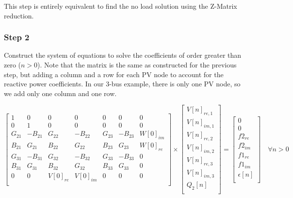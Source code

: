 \documentclass[11pt,fleqn]{book} %
\begin{document}
This step is entirely equivalent to find the no load solution using the Z-Matrix reduction.

\subsubsection{Step 2}

Construct the system of equations to solve the coefficients of order greater than zero ($n>0$). Note that the matrix is the same as constructed for the previous step, but adding a column and a row for each PV node to account for the reactive power coefficients. In our 3-bus example, there is only one PV node, so we add only one column and one row.

\begin{equation}
\begin{bmatrix}
1 & 0 & 0 & 0 & 0 & 0 & 0\\
0 & 1 & 0 & 0 & 0 & 0 & 0\\
G_{21} & -B_{21} & G_{22} & -B_{22} & G_{23} & -B_{23} & W[0]_{im}\\
B_{21} & G_{21}  & B_{22} & G_{22}  & B_{23} & G_{23} & W[0]_{re}\\
G_{31} & -B_{31} & G_{32} & -B_{32} & G_{33} & -B_{33} & 0\\
B_{31} & G_{31}  & B_{32} & G_{32}  & B_{33} & G_{33} & 0\\
0 & 0 & V[0]_{re} & V[0]_{im} & 0 & 0 & 0\\
\end{bmatrix}
\times
\begin{bmatrix}
V[n]_{re, 1}\\
V[n]_{im, 1}\\
V[n]_{re, 2}\\
V[n]_{im, 2}\\
V[n]_{re, 3}\\
V[n]_{im, 3}\\
Q_2[n]\\
\end{bmatrix}
=
\begin{bmatrix}
0\\
0\\
f2_{re}\\
f2_{im}\\
f1_{re}\\
f1_{im}\\
\epsilon[n]\\
\end{bmatrix}
\quad \forall n > 0
\label{lin_sys_2}
\end{equation}
\end{document}
